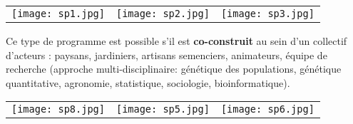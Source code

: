 \begin{frame}

\begin{tabular} {p{} p{} p{}} 
\texttt{[image: sp1.jpg]} \tiny \cite{sp1} & \texttt{[image: sp2.jpg]} \tiny \cite{sp2}  & \texttt{[image: sp3.jpg]} \tiny \cite{sp3} \\
\end{tabular}

	\begin{block}{}
		Ce type de programme est possible s'il est \textbf{co-construit} au sein d'un collectif d'acteurs : paysans, jardiniers, artisans semenciers, animateurs, équipe de recherche (approche multi-disciplinaire: génétique des populations, génétique quantitative, agronomie, statistique, sociologie, bioinformatique).
	\end{block}		

\begin{tabular} {p{} p{} p{}} 
\texttt{[image: sp8.jpg]} \tiny \cite{sp8} & \texttt{[image: sp5.jpg]} \tiny \cite{sp5} & \texttt{[image: sp6.jpg]} \tiny \cite{sp6} \\
\end{tabular}


\end{frame}



